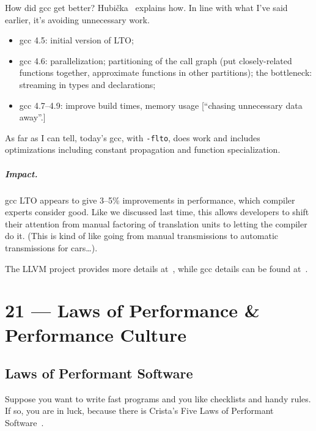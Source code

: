\documentclass[a4paper]{report}
\begin{document}
How did gcc get better?
Hubi\v{c}ka~\cite{hubicka15:_link_gcc} explains how. In line with what I've said earlier, it's
avoiding unnecessary work.
\begin{itemize}[noitemsep]
\item gcc 4.5: initial version of LTO;
\item gcc 4.6: parallelization; partitioning of the call graph (put closely-related functions together, approximate functions in other partitions); the bottleneck: streaming in types and declarations;
\item gcc 4.7--4.9: improve build times, memory usage [``chasing unnecessary data away''.]
\end{itemize}
As far as I can tell, today's gcc, with {\tt -flto}, does work and includes
optimizations including constant propagation and function
specialization.

\paragraph{Impact.} gcc LTO appears to give 3--5\% improvements in performance, which compiler experts consider good.
Like we discussed last time, this allows developers to shift their attention from 
manual factoring of translation units to letting the compiler do it. (This is kind of like going
from manual transmissions to automatic transmissions for cars\ldots).

The LLVM project provides more details at~\cite{project17:_llvm_link_time_optim}, while gcc details
can be found at~\cite{novillo09:_linkt}.










\chapter*{21 --- Laws of Performance \& Performance Culture}


\section*{Laws of Performant Software}

Suppose you want to write fast programs and you like checklists and handy rules. If so, you are in luck, because there is Crista's Five Laws of Performant Software~\cite{lpsw}. 
\end{document}
